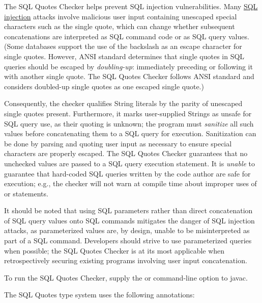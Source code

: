\htmlhr
{}

The SQL Quotes Checker helps prevent SQL injection vulnerabilities. Many
\href{https://en.wikipedia.org/wiki/Sql_injection}{SQL injection} attacks
involve malicious user input containing unescaped special characters such as the
single quote, which can change whether subsequent concatenations are interpreted
as SQL command code or as SQL query values. (Some databases support the use of the
backslash as an escape character for single quotes. However, ANSI standard determines
that single quotes in SQL queries should be escaped by \emph{doubling-up}:
immediately preceding or following it with another single quote. The SQL Quotes Checker
follows ANSI standard and considers doubled-up single quotes as one escaped single quote.)

Consequently, the checker qualifies String literals by the parity of unescaped single
quotes present. Furthermore, it marks user-supplied Strings as unsafe for SQL query
use, as their quoting is unknown; the program must \emph{sanitize} all such values
before concatenating them to a SQL query for execution. Sanitization can be done by
parsing and quoting user input as necessary to ensure special characters are properly
escaped. The SQL Quotes Checker guarantees that no unchecked values are passed to a
SQL query execution statement. It is \emph{unable} to guarantee that hard-coded SQL
queries written by the code author are safe for execution; e.g., the checker will not
warn at compile time about improper uses of  or  statements.

It should be noted that using SQL parameters rather than direct concatenation of
SQL query values onto SQL commands mitigates the danger of SQL injection attacks,
as parameterized values are, by design, unable to be misinterpreted as part of a SQL
command. Developers should strive to use parameterized queries when possible; the
SQL Quotes Checker is at its most applicable when retrospectively securing existing
programs involving user input concatenation.

To run the SQL Quotes Checker, supply the
or
command-line option to javac.


The SQL Quotes type system uses the following annotations:

